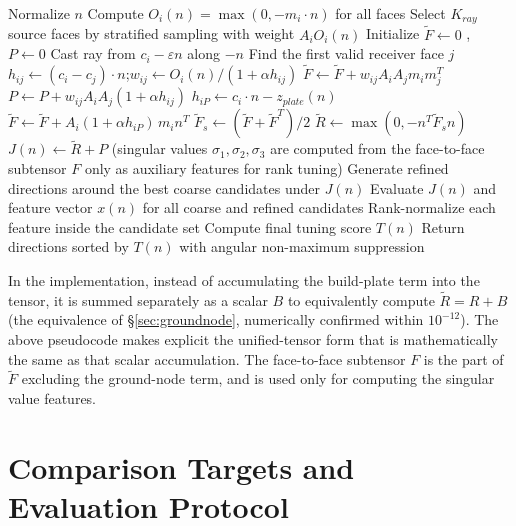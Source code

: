 \documentclass[11pt,a4paper]{article}
\begin{document}
\begin{algorithm}[H]
\caption{Augmented (ground-node) Support Flow Tensor Evaluation with Final Rank Tuning}
\begin{algorithmic}[1]
    \State Normalize $n$
    \State Compute $O_i(n)=\max(0,-m_i\cdot n)$ for all faces
    \State Select $K_{ray}$ source faces by stratified sampling with weight $A_iO_i(n)$
    \State Initialize $\tilde F\gets 0$ , $P\gets 0$
        \State Cast ray from $c_i-\varepsilon n$ along $-n$
        \State Find the first valid receiver face $j$
            \State $h_{ij}\gets(c_i-c_j)\cdot n$;\quad $w_{ij}\gets O_i(n)/(1+\alpha h_{ij})$
            \State $\tilde F\gets \tilde F+w_{ij}A_iA_jm_im_j^T$ 
            \State $P\gets P+w_{ij}A_iA_j(1+\alpha h_{ij})$
        \Else
            \State $h_{iP}\gets c_i\cdot n-z_{plate}(n)$
            \State $\tilde F\gets \tilde F+A_i(1+\alpha h_{iP})\,m_in^T$ 
        \EndIf
    \EndFor
    \State $\tilde F_s\gets(\tilde F+\tilde F^T)/2$
    \State $\tilde R\gets\max(0,-n^T\tilde F_sn)$ 
    \State $J(n)\gets \tilde R+P$
    \State (singular values $\sigma_1,\sigma_2,\sigma_3$ are computed from the face-to-face subtensor $F$ only as auxiliary features for rank tuning)
\EndFor
\State Generate refined directions around the best coarse candidates under $J(n)$
\State Evaluate $J(n)$ and feature vector $x(n)$ for all coarse and refined candidates
\State Rank-normalize each feature inside the candidate set
\State Compute final tuning score $T(n)$
\State Return directions sorted by $T(n)$ with angular non-maximum suppression
\end{algorithmic}
\end{algorithm}

In the implementation, instead of accumulating the build-plate term into the tensor, it is summed separately as a scalar $B$
to equivalently compute $\tilde R=R+B$ (the equivalence of \S\ref{sec:groundnode}, numerically confirmed within $10^{-12}$).
The above pseudocode makes explicit the unified-tensor form that is mathematically the same as that scalar accumulation.
The face-to-face subtensor $F$ is the part of $\tilde F$ excluding the ground-node term, and is used only for computing the singular value features.

\section{Comparison Targets and Evaluation Protocol}
\label{sec:protocol}
\end{document}
